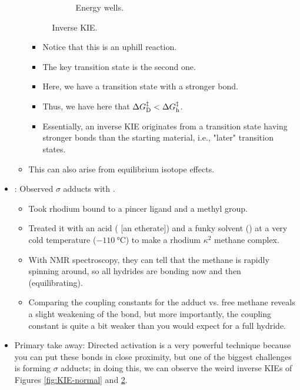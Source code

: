 \documentclass[../notes.tex]{subfiles}
\begin{document}
\begin{itemize}
\begin{itemize}
\begin{figure}[h!]
\begin{subfigure}[b]{0.45\linewidth}
                \caption{Energy wells.}
                \label{fig:KIE-inverseb}
            \end{subfigure}
            \caption{Inverse KIE.}
            \label{fig:KIE-inverse}
        \end{figure}
        \begin{itemize}
            \item Notice that this is an uphill reaction.
            \item The key transition state is the second one.
            \item Here, we have a transition state with a stronger bond.
            \item Thus, we have here that $\Delta G^\ddagger_{\ce{D}}<\Delta G^\ddagger_{\ce{h}}$.
            \item Essentially, an inverse KIE originates from a transition state having stronger bonds than the starting material, i.e., "later" transition states.
        \end{itemize}
        \item This can also arise from equilibrium isotope effects.
    \end{itemize}
    \item \textcite{bib:BernskoetterBrookhart}: Observed $\sigma$ adducts with .
    \begin{itemize}
        \item Took rhodium bound to a pincer ligand and a methyl group.
        \item Treated it with an acid ( [an etherate]) and a funky solvent () at a very cold temperature ($\SI{-110}{\celsius}$) to make a rhodium $\kappa^2$ methane complex.
        \item With NMR spectroscopy, they can tell that the methane is rapidly spinning around, so all hydrides are bonding now and then (equilibrating).
        \item Comparing the  coupling constants for the adduct vs. free methane reveals a slight weakening of the  bond, but more importantly, the  coupling constant is quite a bit weaker than you would expect for a full hydride.
    \end{itemize}
    \item Primary take away: Directed  activation is a very powerful technique because you can put these  bonds in close proximity, but one of the biggest challenges is forming $\sigma$ adducts; in doing this, we can observe the weird inverse KIEs of Figures \ref{fig:KIE-normal} and \ref{fig:KIE-inverse}.
\end{itemize}
\end{document}
